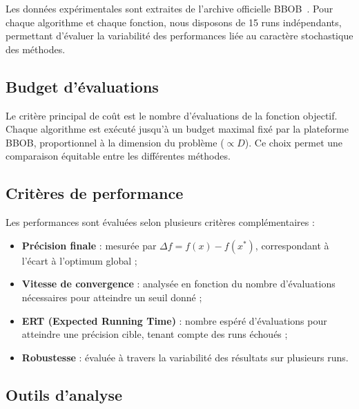 \documentclass[conference]{IEEEtran}
\begin{document}
Les donn\'ees exp\'erimentales sont extraites de l'archive officielle BBOB~\cite{numbbo2024}. Pour chaque algorithme et chaque fonction, nous disposons de 15 runs ind\'ependants, permettant d'\'evaluer la variabilit\'e des performances li\'ee au caract\`ere stochastique des m\'ethodes.

\subsection{Budget d'\'evaluations}

Le crit\`ere principal de co\^ut est le nombre d'\'evaluations de la fonction objectif. Chaque algorithme est ex\'ecut\'e jusqu'\`a un budget maximal fix\'e par la plateforme BBOB, proportionnel \`a la dimension du probl\`eme ($\propto D$). Ce choix permet une comparaison \'equitable entre les diff\'erentes m\'ethodes.

\subsection{Crit\`eres de performance}

Les performances sont \'evalu\'ees selon plusieurs crit\`eres compl\'ementaires :
\begin{itemize}
    \item \textbf{Pr\'ecision finale} : mesur\'ee par $\Delta f = f(x) - f(x^*)$, correspondant \`a l'\'ecart \`a l'optimum global ;
    \item \textbf{Vitesse de convergence} : analys\'ee en fonction du nombre d'\'evaluations n\'ecessaires pour atteindre un seuil donn\'e ;
    \item \textbf{ERT (Expected Running Time)} : nombre esp\'er\'e d'\'evaluations pour atteindre une pr\'ecision cible, tenant compte des runs \'echou\'es ;
    \item \textbf{Robustesse} : \'evalu\'ee \`a travers la variabilit\'e des r\'esultats sur plusieurs runs.
\end{itemize}

\subsection{Outils d'analyse}
\end{document}
